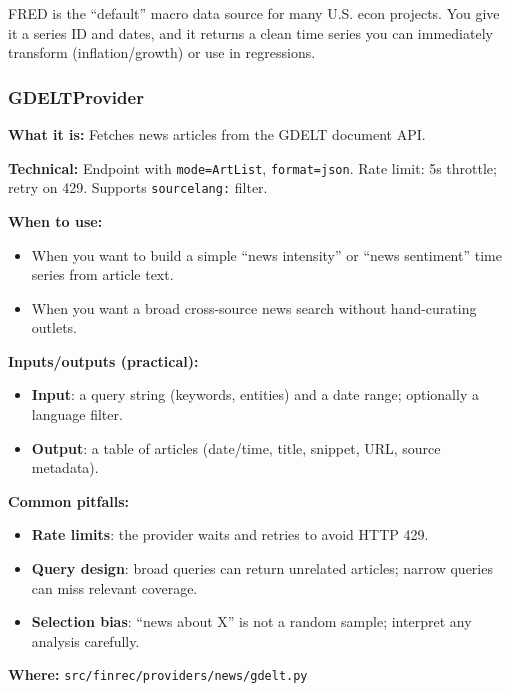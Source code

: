 \documentclass[11pt,a4paper]{article}
\begin{document}
\begin{intuitionbox}
FRED is the ``default'' macro data source for many U.S. econ projects. You give it a series ID and dates, and it returns a clean time series you can immediately transform (inflation/growth) or use in regressions.
\end{intuitionbox}

\subsubsection{GDELTProvider}\label{sec:gdelt}

\textbf{What it is:} Fetches news articles from the GDELT document API.

\textbf{Technical:} Endpoint with \texttt{mode=ArtList}, \texttt{format=json}. Rate limit: 5s throttle; retry on 429. Supports \texttt{sourcelang:} filter.

\textbf{When to use:}
\begin{itemize}[leftmargin=2em]
  \item When you want to build a simple ``news intensity'' or ``news sentiment'' time series from article text.
  \item When you want a broad cross-source news search without hand-curating outlets.
\end{itemize}

\textbf{Inputs/outputs (practical):}
\begin{itemize}[leftmargin=2em]
  \item \textbf{Input}: a query string (keywords, entities) and a date range; optionally a language filter.
  \item \textbf{Output}: a table of articles (date/time, title, snippet, URL, source metadata).
\end{itemize}

\textbf{Common pitfalls:}
\begin{itemize}[leftmargin=2em]
  \item \textbf{Rate limits}: the provider waits and retries to avoid HTTP 429.
  \item \textbf{Query design}: broad queries can return unrelated articles; narrow queries can miss relevant coverage.
  \item \textbf{Selection bias}: ``news about X'' is not a random sample; interpret any analysis carefully.
\end{itemize}

\textbf{Where:} \texttt{src/finrec/providers/news/gdelt.py}
\end{document}
